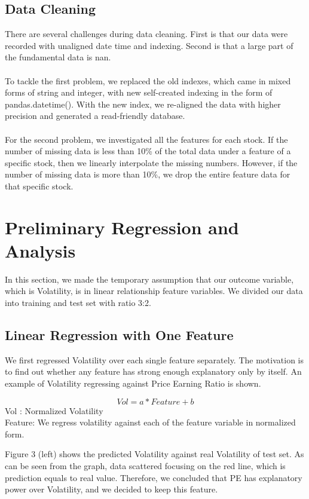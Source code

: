 \documentclass[a4paper]{article}
\begin{document}
\subsection{Data Cleaning}
There are several challenges during data cleaning. First is that our data were recorded with unaligned date time and indexing. Second is that a large part of the fundamental data is nan. 
\\\\To tackle the first problem, we replaced the old indexes, which came in mixed forms of string and integer, with new self-created indexing in the form of pandas.datetime(). With the new index, we re-aligned the data with higher precision and generated a read-friendly database.
\\\\For the second problem, we investigated all the features for each stock. If the number of missing data is less than 10\% of the total data under a feature of a specific stock, then we linearly interpolate the missing numbers. However, if the number of missing data is more than 10\%, we drop the entire feature data for that specific stock.

\section{Preliminary Regression and Analysis}
\label{sec:theory}
In this section, we made the temporary assumption that our outcome variable, which is Volatility, is in linear relationship feature variables. We divided our data into training and test set with ratio 3:2.

\subsection{Linear Regression with One Feature}
We first regressed Volatility over each single feature separately. The motivation is to find out whether any feature has strong enough explanatory only by itself. An example of Volatility regressing against Price Earning Ratio is shown.

\begin{equation}
Vol = a*Feature+b
\end{equation}
Vol : Normalized Volatility
\\Feature: We regress volatility against each of the feature variable in normalized form.

Figure 3 (left) shows the predicted Volatility against real Volatility of test set. As can be seen from the graph, data scattered focusing on the red line, which is prediction equals to real value. Therefore, we concluded that PE has explanatory power over Volatility, and we decided to keep this feature.
\end{document}
